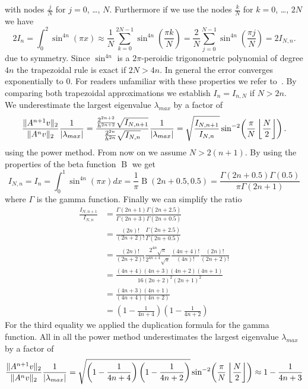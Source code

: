 \documentclass{scrartcl}
\begin{document}
	with nodes $\frac{j}{N}$ for $j=0$, \dots, $N$.
	Furthermore if we use the nodes $\frac{k}{N}$ for $k=0$, \dots, $2N$ we have
	\[
	2I_n = \int_{0}^{2}{\sin^{4n}\!\left(\pi x\right)} \approx
	\frac{1}{N}\sum_{k=0}^{2N-1}\sin^{4n}\!\left(\frac{\pi k}{N}\right)
	= \frac{2}{N}\sum_{j=0}^{N-1}\sin^{4n}\!\left(\frac{\pi j}{N}\right)
	= 2 I_{N,n}.
	\]
	due to symmetry. Since $\sin^{4n}$ is a $2\pi$-peroidic trigonometric polynomial of degree $4n$ the trapezoidal rule is exact if $2N>4n$. In general the error converges exponentially to $0$. For readers unfamiliar with these properties we refer to~\cite[Corollary 3.3]{trapezoidal}. 
	By comparing both trapezoidal approximations we establish $I_n = I_{n,N}$ if $N > 2n$.\\
	We underestimate the largest eigenvalue $\lambda_{max}$ by a factor of
	\begin{align*}
	\frac{\lVert A^{n+1}v\rVert_2}{\lVert A^nv\rVert_2}\frac{1}{\lvert\lambda_{max}\rvert}
	= \frac{\frac{2^{2n+2}}{h^{2n+2}}\sqrt{I_{N,n+1}}}{\frac{2^{2n}}{h^{2n}}\sqrt{I_{N,n}}}\frac{1}{\lvert\lambda_{max}\rvert} = \sqrt{\frac{I_{N,n+1}}{I_{N,n}}}\sin^{-2}\!\left(\frac{\pi}{N}\left\lfloor\frac{N}{2}\right\rfloor\right).
	\end{align*}
	using the power method. From now on we assume $N > 2(n+1)$. By using the properties of the beta function $\operatorname{B}$ we get
	\[
	I_{N,n} = I_{n} = \int_{0}^{1} \sin^{4n}(\pi x)dx = \frac{1}{\pi} \operatorname{B}(2n+0.5,0.5) = \frac{\Gamma(2n + 0.5)\Gamma(0.5)}{\pi \Gamma(2n + 1)}
	\]
	\noindent where $\Gamma$ is the gamma function. Finally we can simplify the ratio
	\begin{align*}
	\frac{I_{N,n+1}}{I_{N,n}} &=   
	\frac{\Gamma(2n + 1)\Gamma(2n + 2.5)}{\Gamma(2n + 3)\Gamma(2n + 0.5)} \\&= 
	\frac{(2n)!}{(2n+2)!}
	\frac{\Gamma(2n + 2.5)}{\Gamma(2n + 0.5)}\\&=
	\frac{(2n)!}{(2n+2)!}
	\frac{2^{4n}\sqrt\pi}{2^{4n+4}\sqrt\pi}
	\frac{(4n+4)!}{(4n)!}
	\frac{(2n)!}{(2n+2)!} \\&=
	\frac{(4n+4)(4n+3)(4n+2)(4n+1)}{16(2n+2)^2(2n+1)^2} \\&=
	\frac{(4n+3)(4n+1)}{(4n+4)(4n+2)}\\&=
	\left(1-\frac{1}{4n+4}\right)\left(1-\frac{1}{4n+2}\right)
	\end{align*}
	For the third equality we applied the duplication formula for the gamma function. All in all the power method underestimates the largest eigenvalue $\lambda_{max}$ by a factor of 
	\[
	\frac{\lVert A^{n+1}v\rVert_2}{\lVert A^{n}v\rVert_2}\frac{1}{\lvert\lambda_{max}\rvert} =
	\sqrt{\left(1-\frac{1}{4n+4}\right)\left(1-\frac{1}{4n+2}\right)}\sin^{-2}\!\left(\frac{\pi}{N}\left\lfloor\frac{N}{2}\right\rfloor\right) \approx 1-\frac{1}{4n+3}
	\]
\end{document}
